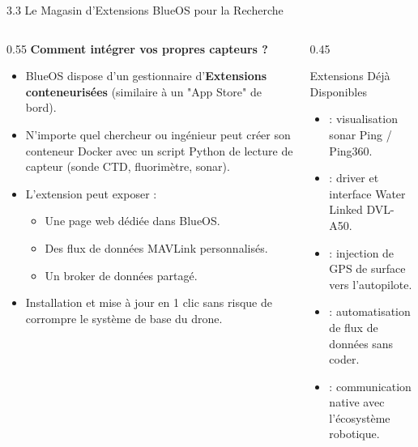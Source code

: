\begin{frame}{3.3 Le Magasin d'Extensions BlueOS pour la Recherche}
  \begin{columns}[c]
    \begin{column}{0.55\textwidth}
      \textbf{Comment intégrer vos propres capteurs ?}
      \begin{itemize}
        \item BlueOS dispose d'un gestionnaire d'\textbf{Extensions conteneurisées} (similaire à un "App Store" de bord).
        \item N'importe quel chercheur ou ingénieur peut créer son conteneur Docker avec un script Python de lecture de capteur (sonde CTD, fluorimètre, sonar).
        \item L'extension peut exposer :
          \begin{itemize}
            \item Une page web dédiée dans BlueOS.
            \item Des flux de données MAVLink personnalisés.
            \item Un broker de données partagé.
          \end{itemize}
        \item Installation et mise à jour en 1 clic sans risque de corrompre le système de base du drone.
      \end{itemize}
    \end{column}

    \begin{column}{0.45\textwidth}
      \begin{block}{Extensions Déjà Disponibles}
        \begin{itemize}
          \item {} : visualisation sonar Ping / Ping360.
          \item {} : driver et interface Water Linked DVL-A50.
          \item {} : injection de GPS de surface vers l'autopilote.
          \item {} : automatisation de flux de données sans coder.
          \item {} : communication native avec l'écosystème robotique.
        \end{itemize}
      \end{block}
    \end{column}
  \end{columns}
\end{frame}

